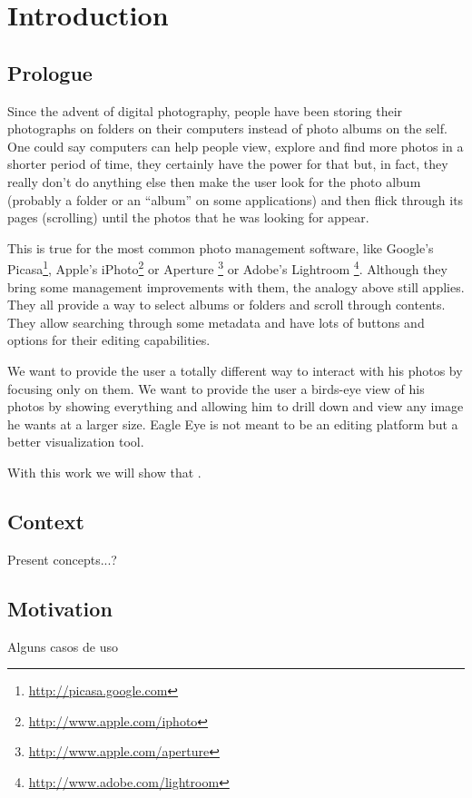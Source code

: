 \chapter{Introduction} %
\label{chapter:introduction}


\section{Prologue} %
\label{sec:prologue}

Since the advent of digital photography, people have been storing their photographs on folders on their computers instead of photo albums on the self. One could say computers can help people view, explore and find more photos in a shorter period of time, they certainly have the power for that but, in fact, they really don't do anything else then make the user look for the photo album (probably a folder or an ``album'' on some applications) and then flick through its pages (scrolling) until the photos that he was looking for appear.

This is true for the most common photo management software, like Google's Picasa\footnote{\url{http://picasa.google.com}}, Apple's iPhoto\footnote{\url{http://www.apple.com/iphoto}} or Aperture \footnote{\url{http://www.apple.com/aperture}} or Adobe's Lightroom \footnote{\url{http://www.adobe.com/lightroom}}. Although they bring some management improvements with them, the analogy above still applies. They all provide a way to select albums or folders and scroll through contents. They allow searching through some metadata and have lots of buttons and options for their editing capabilities.

We want to provide the user a totally different way to interact with his photos by focusing only on them. We want to provide the user a birds-eye view of his photos by showing everything and allowing him to drill down and view any image he wants at a larger size. Eagle Eye is not meant to be an editing platform but a better visualization tool.

With this work we will show that .




\section{Context} %
\label{sec:context}


Present concepts...?


\section{Motivation} %
\label{sec:motivation}

Alguns casos de uso
